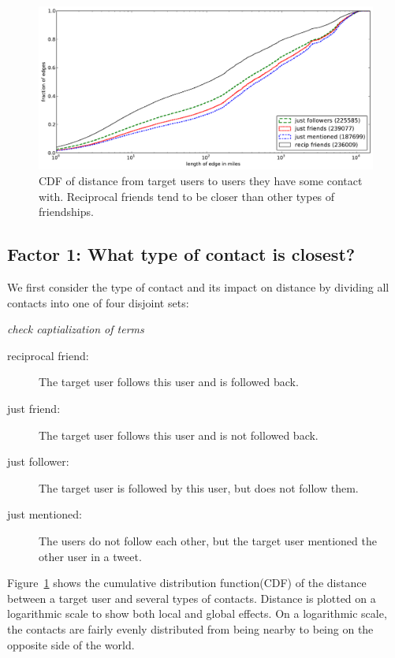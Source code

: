 \documentclass{sig-alternate}
\newcommand{\jam}[1]{\emph{#1}}
\begin{document}
\begin{figure}[tb]
\centering
\includegraphics[width=.9\linewidth]{figures/edge_types_cuml.pdf}
\caption{
CDF of distance from target users to users they have some contact
with.
%
Reciprocal friends tend to be closer than other types of friendships.
}
\label{fig:EdgeTypesCuml}
\vspace{-2pt}
\end{figure}


\subsection{Factor 1: What type of contact is closest?}
\label{sec:EdgeTypes}
We first consider the type of contact and its impact on distance by dividing
all contacts into one of four disjoint sets:

\jam{check captialization of terms}
\begin{description}
\item[reciprocal friend:] The target user follows this user and is followed
    back.
\item[just friend:] The target user follows this user and is not followed
    back.
\item[just follower:] The target user is followed by this user, but does
    not follow them.
\item[just mentioned:] The users do not follow each other, but the target
    user mentioned the other user in a tweet.
\end{description}

Figure~\ref{fig:EdgeTypesCuml} shows the cumulative distribution
function(CDF) of the distance between a target user and several types of
contacts.
%
Distance is plotted on a logarithmic scale to show both local and
global effects.
%
On a logarithmic scale, the contacts are fairly evenly distributed from being
nearby to being on the opposite side of the world.
%
%
%
\end{document}
